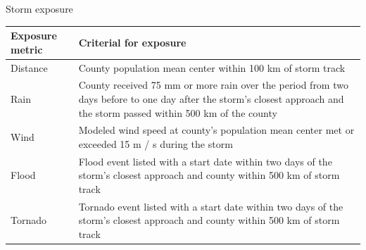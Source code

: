 \documentclass[ignorenonframetext,]{beamer}
\begin{document}
\begin{frame}{Storm exposure}

\footnotesize

\begin{longtable}[]{@{}ll@{}}
\toprule
\begin{minipage}[b]{0.24\columnwidth}\raggedright\strut
Exposure metric\strut
\end{minipage} & \begin{minipage}[b]{0.68\columnwidth}\raggedright\strut
Criterial for exposure\strut
\end{minipage}\tabularnewline
\midrule
\endhead
\begin{minipage}[t]{0.24\columnwidth}\raggedright\strut
Distance\strut
\end{minipage} & \begin{minipage}[t]{0.68\columnwidth}\raggedright\strut
County population mean center within 100 km of storm track\strut
\end{minipage}\tabularnewline
\begin{minipage}[t]{0.24\columnwidth}\raggedright\strut
Rain\strut
\end{minipage} & \begin{minipage}[t]{0.68\columnwidth}\raggedright\strut
County received 75 mm or more rain over the period from two days before
to one day after the storm's closest approach and the storm passed
within 500 km of the county\strut
\end{minipage}\tabularnewline
\begin{minipage}[t]{0.24\columnwidth}\raggedright\strut
Wind\strut
\end{minipage} & \begin{minipage}[t]{0.68\columnwidth}\raggedright\strut
Modeled wind speed at county's population mean center met or exceeded 15
m / s during the storm\strut
\end{minipage}\tabularnewline
\begin{minipage}[t]{0.24\columnwidth}\raggedright\strut
Flood\strut
\end{minipage} & \begin{minipage}[t]{0.68\columnwidth}\raggedright\strut
Flood event listed with a start date within two days of the storm's
closest approach and county within 500 km of storm track\strut
\end{minipage}\tabularnewline
\begin{minipage}[t]{0.24\columnwidth}\raggedright\strut
Tornado\strut
\end{minipage} & \begin{minipage}[t]{0.68\columnwidth}\raggedright\strut
Tornado event listed with a start date within two days of the storm's
closest approach and county within 500 km of storm track\strut
\end{minipage}\tabularnewline
\bottomrule
\end{longtable}

\end{frame}
\end{document}
